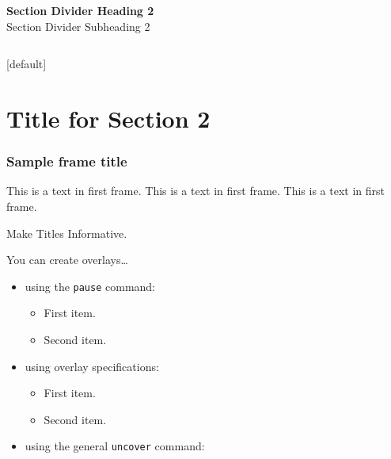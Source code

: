 \documentclass{beamer}
\begin{document}
\begin{frame}
\vspace{1cm}
\begin{columns}
\column{5.5cm}
{\bf{\color{usydwhite}Section Divider Heading 2}}	\\	%
{\color{usydwhite}Section Divider Subheading 2}			%

\column{6cm}
\end{columns}
\end{frame}

%

[default]

\section{Title for Section 2}


\begin{frame}
\frametitle{Sample frame title}
This is a text in first frame. This is a text in first frame. This is a text in first frame.
\end{frame}


\begin{frame}{Make Titles Informative.}

  You can create overlays\dots
  \begin{itemize}
  \item using the \texttt{pause} command:
    \begin{itemize}
    \item
      First item.
      \pause
    \item    
      Second item.
    \end{itemize}
  \item
    using overlay specifications:
    \begin{itemize}
    \item<3->
      First item.
    \item<4->
      Second item.
    \end{itemize}
  \item
    using the general \texttt{uncover} command:
    \begin{itemize}
    \end{itemize}
  \end{itemize}
\end{frame}
\end{document}
